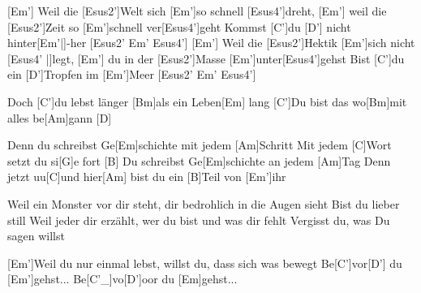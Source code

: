 

\begin{guitar}
	[Em'] Weil die [Esus2']Welt sich [Em']so schnell [Esus4']dreht, [Em'] weil die [Esus2']Zeit so [Em']schnell ver[Esus4']geht
	Kommst [C']du [D'] nicht hinter[Em'|]{-}her [Esus2' Em' Esus4']{}
	[Em'] Weil die [Esus2']Hektik [Em']sich nicht [Esus4' |]{legt,  }[Em'] du in der [Esus2']Masse [Em']unter[Esus4']gehst
	Bist [C']du ein [D']Tropfen im [Em']Meer [Esus2' Em' Esus4']{}
	
	Doch [C']du lebst länger [Bm]als ein Leben[Em] lang
	[C']Du bist das wo[Bm]mit alles be[Am]gann [D]{}
	
	Denn du schreibst Ge[Em]schichte mit jedem [Am]Schritt
	Mit jedem [C]Wort setzt du si[G]e fort [B]{}
	Du schreibst Ge[Em]schichte an jedem [Am]Tag
	Denn jetzt uu[C]und hier[Am] bist du ein [B]Teil von [Em']ihr
	
	Weil ein Monster vor dir steht, dir bedrohlich in die Augen sieht
	Bist du lieber still
	Weil jeder dir erzählt, wer du bist und was dir fehlt
	Vergisst du, was Du sagen willst
	
	 
	
	 
	
	[Em']Weil du nur einmal lebst, willst du, dass sich was bewegt
	Be[C']vor[D'] du [Em']gehst...
	Be[C'_]{vo}[D']oor du [Em]gehst...
	
	 
	
	 
\end{guitar}